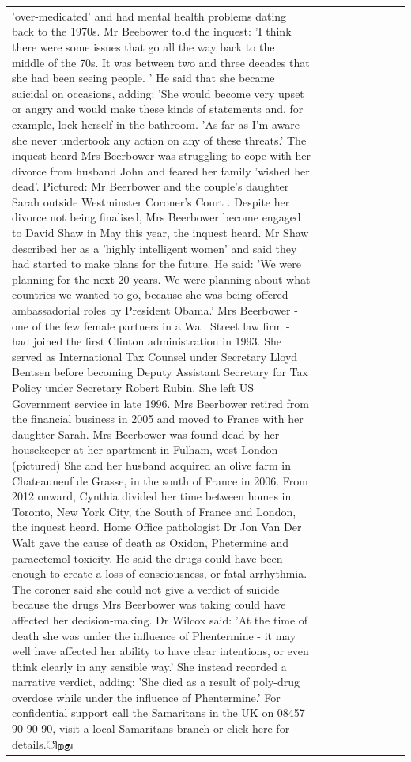 \begin{table}[H]
\begin{tabular}{lllrlllll}
'over-medicated' and had mental health problems dating back to the 1970s. Mr Beebower told the inquest: 'I think there were some issues that go all the way back to the middle of the 70s. It was between two and three decades that she had been seeing people. ' He said that she became suicidal on occasions, adding: 'She would become very upset or angry and would make these kinds of statements and, for example, lock herself in the bathroom. 'As far as I'm aware she never undertook any action on any of these threats.' The inquest heard Mrs Beerbower was struggling to cope with her divorce from husband John and feared her family 'wished her dead'. Pictured: Mr Beerbower and the couple's daughter Sarah outside Westminster Coroner's Court . Despite her divorce not being finalised, Mrs Beerbower become engaged to David Shaw in May this year, the inquest heard. Mr Shaw described her as a 'highly intelligent women' and said they had started to make plans for the future. He said: 'We were planning for the next 20 years. We were planning about what countries we wanted to go, because she was being offered ambassadorial roles by President Obama.' Mrs Beerbower - one of the few female partners in a Wall Street law firm - had joined the first Clinton administration in 1993. She served as International Tax Counsel under Secretary Lloyd Bentsen before becoming Deputy Assistant Secretary for Tax Policy under Secretary Robert Rubin. She left US Government service in late 1996. Mrs Beerbower retired from the financial business in 2005 and moved to France with her daughter Sarah. Mrs Beerbower was found dead by her housekeeper at her apartment in Fulham, west London (pictured) She and her husband acquired an olive farm in Chateauneuf de Grasse, in the south of France in 2006. From 2012 onward, Cynthia divided her time between homes in Toronto, New York City, the South of France and London, the inquest heard. Home Office pathologist Dr Jon Van Der Walt gave the cause of death as Oxidon, Phetermine and paracetemol toxicity. He said the drugs could have been enough to create a loss of consciousness, or fatal arrhythmia. The coroner said she could not give a verdict of suicide because the drugs Mrs Beerbower was taking could have affected her decision-making. Dr Wilcox said: 'At the time of death she was under the influence of Phentermine - it may well have affected her ability to have clear intentions, or even think clearly in any sensible way.' She instead recorded a narrative verdict, adding: 'She died as a result of poly-drug overdose while under the influence of Phentermine.' For confidential support call the Samaritans in the UK on 08457 90 90 90, visit a local Samaritans branch or click here for details.ிறது \\

\end{tabular}
\end{table}
